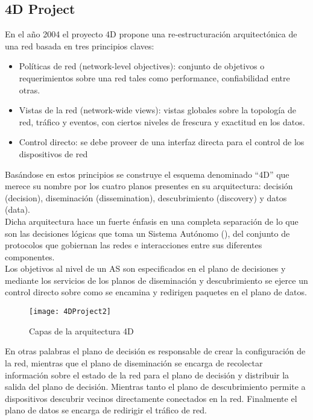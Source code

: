 \subsection{4D Project}
En el año 2004 el proyecto 4D \citep{rexford2004network}\citep{greenberg2005clean} propone una re-estructuración arquitectónica de una red basada en tres principios claves: 

\begin{itemize}
\item Políticas de red (network-level objectives): conjunto de objetivos o requerimientos sobre una red tales como performance, confiabilidad entre otras.

\item Vistas de la red (network-wide views): vistas globales sobre la topolog\'ia de red, tr\'afico y eventos, con ciertos niveles de frescura y exactitud en los datos.

\item Control directo: se debe proveer de una interfaz directa para el control de los dispositivos de red
\end{itemize}

Basándose en estos principios se construye el esquema denominado ``4D'' que merece su nombre por los cuatro planos presentes en su arquitectura: decisión (decision), diseminación (dissemination), descubrimiento (discovery) y datos (data).\\

Dicha arquitectura hace un fuerte énfasis en una completa separación de lo que son las decisiones lógicas que toma un Sistema Autónomo (), del conjunto de protocolos que gobiernan las redes e interacciones entre sus diferentes componentes.\\

Los objetivos al nivel de un AS son especificados en el plano de decisiones y mediante los servicios de los planos de diseminación y descubrimiento se ejerce un control directo sobre como se encamina y redirigen paquetes en el plano de datos.\\

\begin{figure}[htbp!] 
\centering    
\texttt{[image: 4DProject2]}
\caption[Capas de la arquitectura 4D]{Capas de la arquitectura 4D}
\label{fig:4DProject}
\end{figure}

En otras palabras el plano de decisión es responsable de crear la configuración de la red, mientras que el plano de diseminación se encarga de recolectar información sobre el estado de la red para el plano de decisión y distribuir la salida del plano de decisión. Mientras tanto el plano de descubrimiento permite a dispositivos descubrir vecinos directamente conectados en la red. Finalmente el plano de datos se encarga de redirigir el tráfico de red.\\ \\


